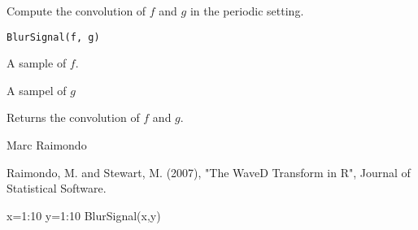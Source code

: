 \begin{Description}\relax
Compute the convolution of $f$ and $g$ in the periodic setting.
\end{Description}
\begin{Usage}
\begin{verbatim}
BlurSignal(f, g)
\end{verbatim}
\end{Usage}
\begin{Arguments}
\begin{ldescription}
\item[\code{f}] A sample of $f$.
\item[\code{g}] A sampel of $g$ 
\end{ldescription}
\end{Arguments}
\begin{Value}
Returns the convolution of $f$ and $g$.
\end{Value}
\begin{Author}\relax
Marc Raimondo
\end{Author}
\begin{References}\relax
Raimondo, M. and Stewart, M. (2007),
"The WaveD Transform in R", Journal of Statistical Software.
\end{References}
\begin{SeeAlso}\relax
{}
\end{SeeAlso}
\begin{Examples}
\begin{ExampleCode} 
x=1:10
y=1:10 
BlurSignal(x,y)

\end{ExampleCode}
\end{Examples}

